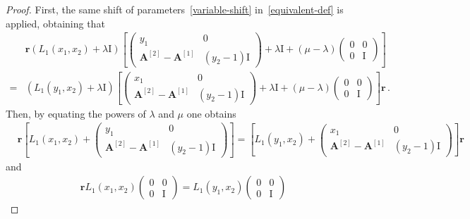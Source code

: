 \documentclass[10pt,a4paper]{amsart}
\newcommand{\ID}{\mathrm{I}}
\newcommand{\OA}{\mathbf{A}}
\begin{document}
\begin{proof}
First, the same shift of parameters~\eqref{variable-shift} in~\eqref{equivalent-def} is applied, obtaining that \begin{equation}
	\begin{split}
		&\mathbf{r}\left(L_{1}(x_{1},x_{2})+\lambda \ID\right) \left[\left(\begin{array}{cc}
			y_1&0\\
			\OA^{[2]}-\OA^{[1]}&(y_{2}-1)\ID
		\end{array}\right)+\lambda\ID+(\mu-\lambda)\begin{pmatrix}
			0&0\\
			0&\ID
		\end{pmatrix}\right]\\
		=&
		\left(L_{1}(y_{1},x_{2})+\lambda \ID\right) \left[\left(\begin{array}{cc}
			x_1&0\\
			\OA^{[2]}-\OA^{[1]}&(y_{2}-1)\ID
		\end{array}\right)+\lambda\ID+(\mu-\lambda)\begin{pmatrix}
			0&0\\
			0&\ID
		\end{pmatrix}\right]\mathbf{r}\,.
	\end{split}
\end{equation}
Then, by equating the powers of $\lambda$ and $\mu$ one obtains
\begin{equation}\label{eqqq}
	\begin{split}
		&\mathbf{r}\left[L_{1}(x_{1},x_{2})+\left(\begin{array}{cc}
			y_1&0\\
			\OA^{[2]}-\OA^{[1]}&(y_{2}-1)\ID
		\end{array}\right)\right]=\left[L_{1}(y_{1},x_{2})+\left(\begin{array}{cc}
			x_1&0\\
			\OA^{[2]}-\OA^{[1]}&(y_{2}-1)\ID
		\end{array}\right)\right]\mathbf{r}
	\end{split}
\end{equation}
and
\begin{equation}\label{eq:rLI}
	\begin{split}
		\mathbf{r}L_{1}(x_{1},x_{2})\begin{pmatrix}
			0&0\\
			0&\ID
		\end{pmatrix}=L_{1}(y_{1},x_{2})\begin{pmatrix}
			0&0\\
			0&\ID

\end{pmatrix}
\end{split}
\end{equation}
\end{proof}
\end{document}
